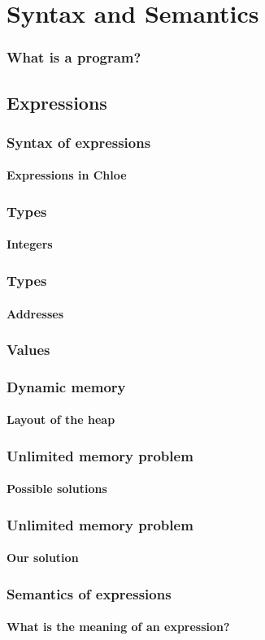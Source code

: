 \section{Syntax and Semantics}

\begin{frame}
\frametitle{What is a program?}


\end{frame}

\subsection{Expressions}

\begin{frame}
\frametitle{Syntax of expressions}
\framesubtitle{Expressions in Chloe}


\end{frame}

\begin{frame}
\frametitle{Types}
\framesubtitle{Integers}


\end{frame}

\begin{frame}
\frametitle{Types}
\framesubtitle{Addresses}


\end{frame}

\begin{frame}
\frametitle{Values}
\framesubtitle{}


\end{frame}

\begin{frame}
\frametitle{Dynamic memory}
\framesubtitle{Layout of the heap}


\end{frame}


\begin{frame}
\frametitle{Unlimited memory problem}
\framesubtitle{Possible solutions}


\end{frame}


\begin{frame}
\frametitle{Unlimited memory problem}
\framesubtitle{Our solution}


\end{frame}


\begin{frame}
\frametitle{Semantics of expressions}
\framesubtitle{What is the meaning of an expression?}


\end{frame}


